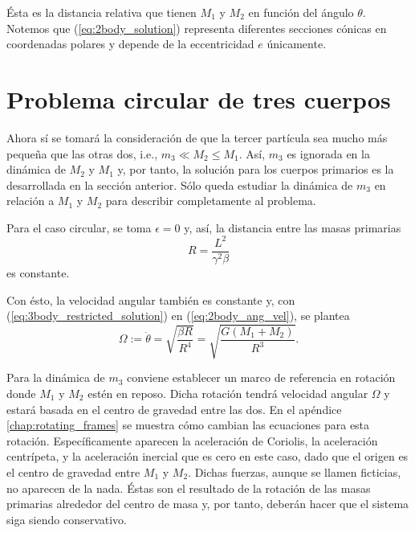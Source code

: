 Ésta es la distancia relativa que tienen $M_1$ y $M_2$ en función del ángulo $\theta$. Notemos que (\ref{eq:2body_solution}) representa diferentes secciones cónicas en coordenadas polares y depende de la eccentricidad $e$ únicamente.

\section{Problema circular de tres cuerpos}
\label{sec:R3BP}

Ahora sí se tomará la consideración de que la tercer partícula sea mucho más pequeña que las otras dos, i.e., $m_3 \ll M_2 \leq M_1$. Así, $m_3$ es ignorada en la dinámica de $M_2$ y $M_1$ y, por tanto, la solución para los cuerpos primarios es la desarrollada en la sección anterior. Sólo queda estudiar la dinámica de $m_3$ en relación a $M_1$ y $M_2$ para describir completamente al problema.

Para el caso circular, se toma $\epsilon = 0$ y, así, la distancia entre las masas primarias
\begin{equation}
 R = \frac{L^2}{\gamma^2 \beta}
 \label{eq:3body_restricted_solution}
\end{equation} 
es constante.

Con ésto, la velocidad angular también es constante y, con (\ref{eq:3body_restricted_solution}) en (\ref{eq:2body_ang_vel}), se plantea
\begin{equation}
 \Omega := \dot{\theta} = \sqrt{ \frac{\beta R}{R^4} } = \sqrt{\frac{G \left(M_1 + M_2 \right)}{R^3}}.
 \label{eq:3body_ang_velocity}
\end{equation}

Para la dinámica de $m_3$ conviene establecer un marco de referencia en rotación donde $M_1$ y $M_2$ estén en reposo. Dicha rotación tendrá velocidad angular $\Omega$ y estará basada en el centro de gravedad entre las dos. En el apéndice \ref{chap:rotating_frames} se muestra cómo cambian las ecuaciones para esta rotación. Específicamente aparecen la aceleración de Coriolis, la aceleración centrípeta, y la aceleración inercial que es cero en este caso, dado que el origen es el centro de gravedad entre $M_1$ y $M_2$. Dichas fuerzas, aunque se llamen ficticias, no aparecen de la nada. Éstas son el resultado de la rotación de las masas primarias alrededor del centro de masa y, por tanto, deberán hacer que el sistema siga siendo conservativo. 


